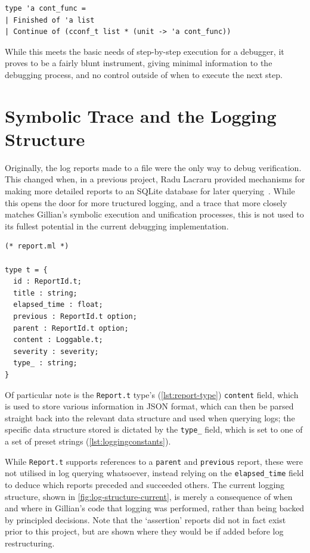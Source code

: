 \begin{lstlisting}[caption={
  The original \texttt{cont\_func} type
  \label{lst:contfunc-type-original}}, style=code, numbers=none]
type 'a cont_func =
| Finished of 'a list
| Continue of (cconf_t list * (unit -> 'a cont_func))
\end{lstlisting}

While this meets the basic needs of step-by-step execution for a debugger, it
proves to be a fairly blunt instrument, giving minimal information to the
debugging process, and no control outside of when to execute the next step.


\section{Symbolic Trace and the Logging Structure}\label{sec:current:trace}

Originally, the log reports made to a file were the only way to debug
verification. This changed when, in a previous project, Radu Lacraru provided
mechanisms for making more detailed reports to an SQLite database for later
querying~\cite{gillian-logging-2020}. While this opens the door for more 
tructured logging, and a trace that more closely matches Gillian's symbolic
execution and unification processes, this is not used to its fullest potential
in the current debugging implementation.

\begin{lstlisting}[caption={
  The \texttt{Report.t} type
  \label{lst:report-type}}, style=code, numbers=none]
(* report.ml *)

type t = {
  id : ReportId.t;
  title : string;
  elapsed_time : float;
  previous : ReportId.t option;
  parent : ReportId.t option;
  content : Loggable.t;
  severity : severity;
  type_ : string;
}
\end{lstlisting}

Of particular note is the \texttt{Report.t} type's (\autoref{lst:report-type})
\texttt{content} field, which is used to store various information in JSON
format, which can then be parsed straight back into the relevant data structure
and used when querying logs; the specific data structure stored is dictated by
the \texttt{type\_} field, which is set to one of a set of preset strings
(\autoref{lst:loggingconstants}).

While \texttt{Report.t} supports references to a \texttt{parent} and
\texttt{previous} report, these were not utilised in log querying whatsoever,
instead relying on the \texttt{elapsed\_time} field to deduce which reports
preceded and succeeded others. The current logging structure, shown in
\autoref{fig:log-structure-current}, is merely a consequence of when and where
in Gillian's code that logging was performed, rather than being backed by
principled decisions. Note that the `assertion' reports did not in fact exist
prior to this project, but are shown where they would be if added before log
restructuring.

